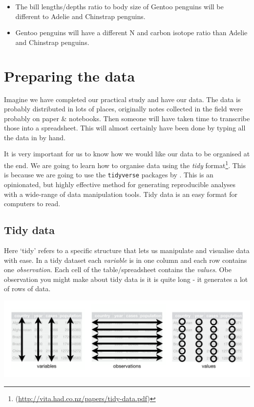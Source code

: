 \documentclass[
]{book}
\begin{document}
\begin{itemize}
\item
  The bill lengths/depths ratio to body size of Gentoo penguins will be different to Adelie and Chinstrap penguins.
\item
  Gentoo penguins will have a different N and carbon isotope ratio than Adelie and Chinstrap penguins.
\end{itemize}

\hypertarget{preparing-the-data}{%
\section{Preparing the data}\label{preparing-the-data}}

Imagine we have completed our practical study and have our data. The data is probably distributed in lots of places, originally notes collected in the field were probably on paper \& notebooks. Then someone will have taken time to transcribe those into a spreadsheet. This will almost certainly have been done by typing all the data in by hand.

It is very important for us to know how we would like our data to be organised at the end. We are going to learn how to organise data using the \emph{tidy} format\footnote{(\url{http://vita.had.co.nz/papers/tidy-data.pdf})}. This is because we are going to use the \texttt{tidyverse} packages by \citet{tidyverse2019}. This is an opinionated, but highly effective method for generating reproducible analyses with a wide-range of data manipulation tools. Tidy data is an easy format for computers to read.

\hypertarget{tidy-data}{%
\subsection{Tidy data}\label{tidy-data}}

Here `tidy' refers to a specific structure that lets us manipulate and visualise data with ease. In a tidy dataset each \emph{variable} is in one column and each row contains one \emph{observation}. Each cell of the table/spreadsheet contains the \emph{values}. Obe observation you might make about tidy data is it is quite long - it generates a lot of rows of data.

\includegraphics[width=0.8\linewidth]{images/tidy-1}
\end{document}
